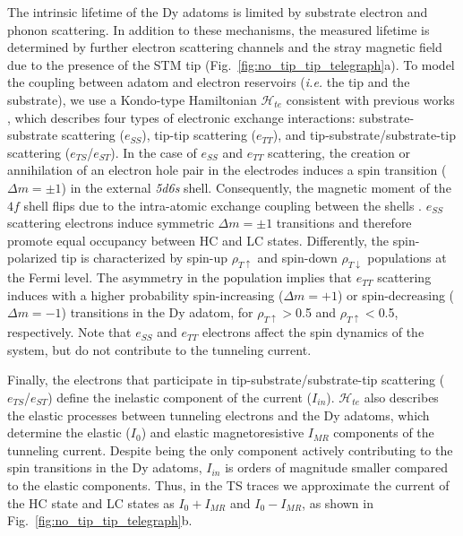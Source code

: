 \documentclass[
reprint,amsmath,amssymb,aps]{revtex4-2}
\begin{document}
The intrinsic lifetime of the Dy adatoms is limited by substrate electron and phonon scattering. In addition to these mechanisms, the measured lifetime is determined by further electron scattering channels and the stray magnetic field due to the presence of the STM tip (Fig.~\ref{fig:no_tip_tip_telegraph}a).
To model the coupling between adatom and electron reservoirs (\textit{i.e.} the tip and the substrate), we use a Kondo-type Hamiltonian $\mathcal{H}_{te}$ consistent with previous works \cite{anderson1966,schrieffer1966,appelbaum1967,delgado2010,loth2010,Ternes2015}, which describes four types of electronic exchange interactions: substrate-substrate scattering ($e_{SS}$), tip-tip scattering ($e_{TT}$), and tip-substrate/substrate-tip scattering ($e_{TS}$/$e_{ST}$). In the case of $e_{SS}$ and $e_{TT}$ scattering, the creation or annihilation of an electron hole pair in the electrodes induces a spin transition ($\Delta m=\pm 1$) in the external \textit{5d6s} shell. Consequently, the magnetic moment of the $4f$ shell flips due to the intra-atomic exchange coupling between the shells \cite{pivettaMeasuringIntraAtomicExchange2020}.
$e_{SS}$ scattering electrons induce symmetric $\Delta m=\pm 1$ transitions and therefore promote equal occupancy between HC and LC states.
Differently, the spin-polarized tip is characterized by spin-up $\rho_{T\uparrow}$ and spin-down $\rho_{T\downarrow}$ populations at the Fermi level. The asymmetry in the population implies that $e_{TT}$ scattering induces with a higher probability spin-increasing ($\Delta m=+1$)  or spin-decreasing ($\Delta m=-1$) transitions in the Dy adatom, for $\rho_{T\uparrow}>$0.5 and $\rho_{T\uparrow}<$0.5, respectively.
Note that $e_{SS}$ and $e_{TT}$ electrons affect the spin dynamics of the system, but do not contribute to the tunneling current.

Finally, the electrons that participate in tip-substrate/substrate-tip scattering ($e_{TS}$/$e_{ST}$) define the inelastic component of the current ($I_{in}$). $\mathcal{H}_{te}$ also describes the elastic processes between tunneling electrons and the Dy adatoms, which determine the elastic ($I_0$) and elastic magnetoresistive $I_{MR}$ components of the tunneling current.
Despite being the only component actively contributing to the spin transitions in the Dy adatoms, $I_{in}$ is orders of magnitude smaller compared to the elastic components. Thus, in the TS traces we approximate the current of the HC state and LC states as $I_0+I_{MR}$ and $I_0-I_{MR}$, as shown in Fig.~\ref{fig:no_tip_tip_telegraph}b.
\end{document}
